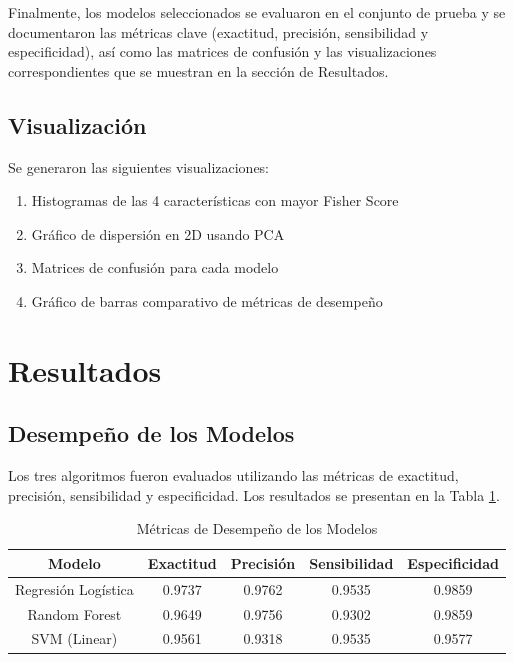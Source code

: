 \documentclass[conference]{IEEEtran}
\begin{document}
Finalmente, los modelos seleccionados se evaluaron en el conjunto de prueba y se documentaron las métricas clave (exactitud, precisión, sensibilidad y especificidad), así como las matrices de confusión y las visualizaciones correspondientes que se muestran en la sección de Resultados.

\subsection{Visualización}
Se generaron las siguientes visualizaciones:
\begin{enumerate}
\item Histogramas de las 4 características con mayor Fisher Score
\item Gráfico de dispersión en 2D usando PCA
\item Matrices de confusión para cada modelo
\item Gráfico de barras comparativo de métricas de desempeño
\end{enumerate}

\section{Resultados}

\subsection{Desempeño de los Modelos}

Los tres algoritmos fueron evaluados utilizando las métricas de exactitud, precisión, sensibilidad y especificidad. Los resultados se presentan en la Tabla \ref{tab:metrics}.

\begin{table}[htbp]
\caption{Métricas de Desempeño de los Modelos}
\begin{center}
\begin{tabular}{|c|c|c|c|c|}
\hline
\textbf{Modelo} & \textbf{Exactitud} & \textbf{Precisión} & \textbf{Sensibilidad} & \textbf{Especificidad} \\
\hline
Regresión Logística & 0.9737 & 0.9762 & 0.9535 & 0.9859 \\
\hline
Random Forest & 0.9649 & 0.9756 & 0.9302 & 0.9859 \\
\hline
SVM (Linear) & 0.9561 & 0.9318 & 0.9535 & 0.9577 \\
\hline
\end{tabular}
\label{tab:metrics}
\end{center}
\end{table}
\end{document}
